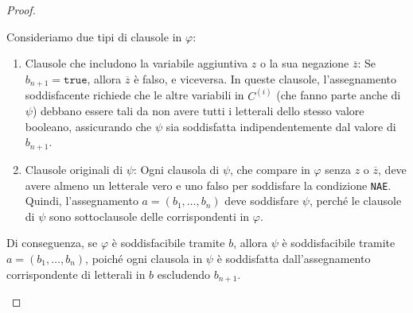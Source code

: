 \begin{proof}
\begin{itemize}
\begin{description}
        Consideriamo due tipi di clausole in \( \varphi \):
        \begin{enumerate}
            \item Clausole che includono la variabile aggiuntiva \( z \) o la sua negazione
            \( \overline{z} \): Se \( b_{n+1} = \texttt{true} \), allora \( \overline{z} \) è falso,
            e viceversa. In queste clausole, l'assegnamento soddisfacente richiede che le altre
            variabili in \( C^{(i)} \) (che fanno parte anche di \( \psi \)) debbano essere tali
            da non avere tutti i letterali dello stesso valore booleano, assicurando che \( \psi \)
            sia soddisfatta indipendentemente dal valore di \( b_{n+1} \).
            \item Clausole originali di \( \psi \): Ogni clausola di \( \psi \), che compare in
            \( \varphi \) senza \( z \) o \( \overline{z} \), deve avere almeno un letterale vero e
            uno falso per soddisfare la condizione \texttt{NAE}. Quindi, l'assegnamento
            \( a = (b_1, \dots, b_n) \) deve soddisfare \( \psi \), perché le clausole di \( \psi \)
            sono sottoclausole delle corrispondenti in \( \varphi \).
        \end{enumerate}

        Di conseguenza, se \( \varphi \) è soddisfacibile tramite \( b \), allora \( \psi \) è
        soddisfacibile tramite \( a = (b_1, \dots, b_n) \), poiché ogni clausola in \( \psi \)
        è soddisfatta dall'assegnamento corrispondente di letterali in \( b \) escludendo \( b_{n+1} \).

    \end{description}
\end{itemize}
\end{proof}
